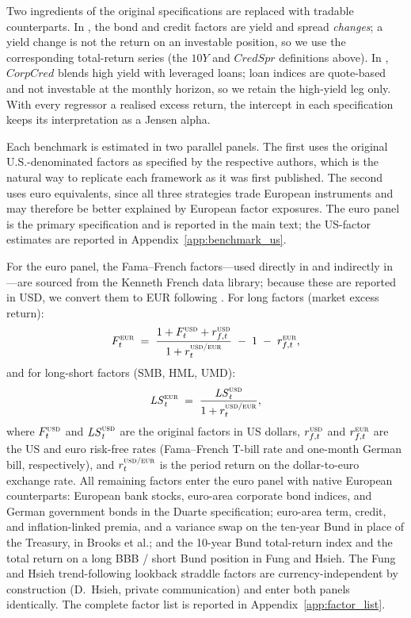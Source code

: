 Two ingredients of the original specifications are replaced with
tradable counterparts. In \citet{fung2004hedge}, the bond and credit
factors are yield and spread \emph{changes}; a yield change is not the
return on an investable position, so we use the corresponding
total-return series (the $\textit{10Y}$ and $\textit{CredSpr}$
definitions above). In \citet{brooks2020active},
$\textit{CorpCred}$ blends high yield with leveraged loans; loan
indices are quote-based and not investable at the monthly horizon, so
we retain the high-yield leg only. With every regressor a realised
excess return, the intercept in each specification keeps its
interpretation as a Jensen alpha.

Each benchmark is estimated in two parallel panels. The first uses the
original U.S.-denominated factors as specified by the respective
authors, which is the natural way to replicate each framework as it
was first published. The second uses euro equivalents, since all three
strategies trade European instruments and may therefore be better
explained by European factor exposures. The euro panel is the primary
specification and is reported in the main text; the US-factor
estimates are reported in Appendix~\ref{app:benchmark_us}.

For the euro panel, the Fama--French factors---used directly in
\citet{duarte2007risk} and indirectly in \citet{fung2004hedge}---are
sourced from the Kenneth French data library; because these are
reported in USD, we convert them to EUR following
\citet{gluck2021currency}. For long factors (market excess return):
\begin{equation}\label{eq:gluck_long}
  F_{t}^{\textsc{eur}}
  \;=\; \frac{1 + F_{t}^{\textsc{usd}} + r_{f,t}^{\textsc{usd}}}
             {1 + r_{t}^{\textsc{usd/eur}}}
        \;-\; 1 \;-\; r_{f,t}^{\textsc{eur}},
\end{equation}
and for long-short factors (SMB, HML, UMD):
\begin{equation}\label{eq:gluck_ls}
  \mathit{LS}_{t}^{\textsc{eur}}
  \;=\; \frac{\mathit{LS}_{t}^{\textsc{usd}}}
             {1 + r_{t}^{\textsc{usd/eur}}},
\end{equation}
where $F_{t}^{\textsc{usd}}$ and $\mathit{LS}_{t}^{\textsc{usd}}$ are
the original factors in US dollars, $r_{f,t}^{\textsc{usd}}$ and
$r_{f,t}^{\textsc{eur}}$ are the US and euro risk-free rates
(Fama--French T-bill rate and one-month German bill, respectively),
and $r_{t}^{\textsc{usd/eur}}$ is the period return on the
dollar-to-euro exchange rate. All remaining factors enter the euro
panel with native European counterparts: European bank stocks,
euro-area corporate bond indices, and German government bonds in the
Duarte specification; euro-area term, credit, and inflation-linked
premia, and a variance swap on the ten-year Bund in place of the
Treasury, in Brooks et al.; and the 10-year Bund total-return index and
the total return on a long BBB / short Bund position in Fung and
Hsieh. The Fung and Hsieh trend-following lookback straddle factors are currency-independent by
construction (D.~Hsieh, private communication) and enter both panels
identically. The complete factor list is reported in
Appendix~\ref{app:factor_list}.

